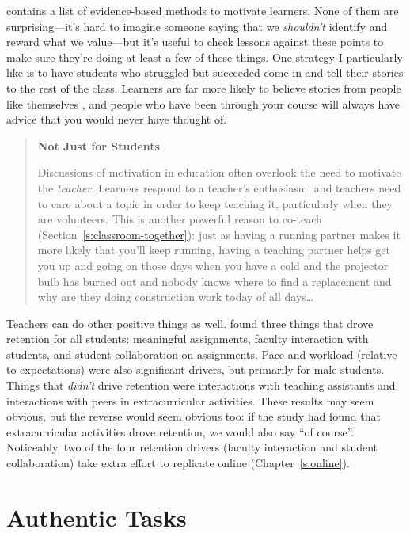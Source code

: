 \cite{Ambr2010} contains a list of evidence-based methods to motivate
learners. None of them are surprising---it's hard to imagine someone
saying that we \emph{shouldn't} identify and reward what we value---but it's
useful to check lessons against these points to make sure they're doing
at least a few of these things. One strategy I particularly like is to
have students who struggled but succeeded come in and tell their stories
to the rest of the class. Learners are far more likely to believe
stories from people like themselves \cite{Mill2016a}, and people who
have been through your course will always have advice that you would
never have thought of.

\begin{quote}\setlength{\parindent}{0pt}
\textbf{Not Just for Students}

Discussions of motivation in education often overlook the need to
motivate the \emph{teacher}. Learners respond to a teacher's enthusiasm,
and teachers need to care about a topic in order to keep teaching it,
particularly when they are volunteers. This is another powerful reason
to co-teach (Section~\ref{s:classroom-together}): just as having a
running partner makes it more likely that you'll keep running, having
a teaching partner helps get you up and going on those days when you
have a cold and the projector bulb has burned out and nobody knows
where to find a replacement and why are they doing construction work
today of all days\ldots{}
\end{quote}

Teachers can do other positive things as well. \cite{Bark2014} found
three things that drove retention for all students: meaningful
assignments, faculty interaction with students, and student
collaboration on assignments. Pace and workload (relative to
expectations) were also significant drivers, but primarily for male
students. Things that \emph{didn't} drive retention were interactions with
teaching assistants and interactions with peers in extracurricular
activities. These results may seem obvious, but the reverse would seem
obvious too: if the study had found that extracurricular activities
drove retention, we would also say ``of course''. Noticeably, two of the
four retention drivers (faculty interaction and student collaboration)
take extra effort to replicate online (Chapter~\ref{s:online}).

\section{Authentic Tasks}\label{s:motivation-authentic}

